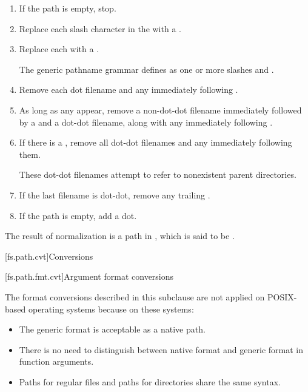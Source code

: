 \begin{enumerate}
\item If the path is empty, stop.
\item Replace each slash character in the  with a .
\item Replace each  with a .
\begin{note}
The generic pathname grammar defines  as one or more slashes and .
\end{note}
\item Remove each dot filename and any immediately following .
\item As long as any appear, remove a non-dot-dot filename immediately followed by a  and a dot-dot filename, along with any immediately following .
\item If there is a , remove all dot-dot filenames and any  immediately following them.
\begin{note}
These dot-dot filenames attempt to refer to nonexistent parent directories.
\end{note}
\item If the last filename is dot-dot, remove any trailing .
\item If the path is empty, add a dot.
\end{enumerate}

The result of normalization is a path in ,
which is said to be .
%

[fs.path.cvt]{Conversions}

[fs.path.fmt.cvt]{Argument format conversions}

\pnum
\begin{note}
The format conversions described in this subclause
are not applied on POSIX-based operating systems
because on these systems:
\begin{itemize}
\item The generic format is acceptable as a native path.
\item There is no need to distinguish between native format and generic format in function arguments.
\item Paths for regular files and paths for directories share the same syntax.
\end{itemize}
\end{note}

